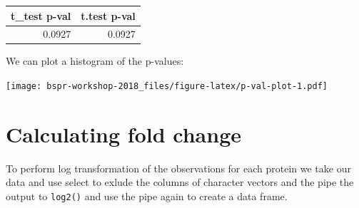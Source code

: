 \documentclass[12pt,]{book}
\newenvironment{Shaded}{\begin{snugshade}}{\end{snugshade}}
\newcommand{\KeywordTok}[1]{\textcolor[rgb]{0.13,0.29,0.53}{\textbf{#1}}}
\newcommand{\DataTypeTok}[1]{\textcolor[rgb]{0.13,0.29,0.53}{#1}}
\newcommand{\DecValTok}[1]{\textcolor[rgb]{0.00,0.00,0.81}{#1}}
\newcommand{\FloatTok}[1]{\textcolor[rgb]{0.00,0.00,0.81}{#1}}
\newcommand{\StringTok}[1]{\textcolor[rgb]{0.31,0.60,0.02}{#1}}
\newcommand{\CommentTok}[1]{\textcolor[rgb]{0.56,0.35,0.01}{\textit{#1}}}
\newcommand{\OperatorTok}[1]{\textcolor[rgb]{0.81,0.36,0.00}{\textbf{#1}}}
\newcommand{\NormalTok}[1]{#1}
\theoremstyle{definition}
\theoremstyle{definition}
\theoremstyle{definition}
\theoremstyle{remark}
\begin{document}
\begin{Shaded}
\end{Shaded}

\begin{tabular}{rr}
\toprule
t\_test p-val & t.test p-val\\
\midrule
0.0927 & 0.0927\\
\bottomrule
\end{tabular}

We can plot a histogram of the p-values:

\begin{Shaded}
\end{Shaded}

\texttt{[image: bspr-workshop-2018\_files/figure-latex/p-val-plot-1.pdf]}

\section{Calculating fold change}\label{calculating-fold-change}

To perform log transformation of the observations for each protein we
take our data and use select to exlude the columns of character vectors
and the pipe the output to \texttt{log2()} and use the pipe again to
create a data frame.
\end{document}
